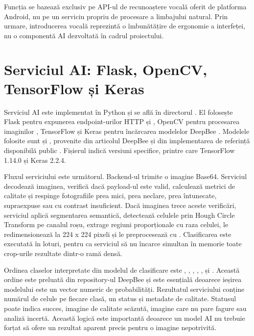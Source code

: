 Funcția se bazează exclusiv pe API-ul de recunoaștere vocală oferit de platforma Android, nu pe un serviciu propriu de procesare a limbajului natural. Prin urmare, introducerea vocală reprezintă o îmbunătățire de ergonomie a interfeței, nu o componentă AI dezvoltată în cadrul proiectului.

\section{Serviciul AI: Flask, OpenCV, TensorFlow și Keras}

Serviciul AI este implementat în Python și se află în directorul . El folosește Flask pentru expunerea endpoint-urilor HTTP  și  \cite{flaskDocs}, OpenCV pentru procesarea imaginilor \cite{opencvDocs}, TensorFlow și Keras pentru încărcarea modelelor DeepBee \cite{tensorflowDocs,kerasDocs}. Modelele folosite sunt  și , provenite din articolul DeepBee \cite{deepbeeArticle} și din implementarea de referință disponibilă public \cite{deepbeeSource}. Fișierul  indică versiuni specifice, printre care TensorFlow 1.14.0 și Keras 2.2.4.

Fluxul serviciului este următorul. Backend-ul trimite o imagine Base64. Serviciul decodează imaginea, verifică dacă payload-ul este valid, calculează metrici de calitate și respinge fotografiile prea mici, prea neclare, prea întunecate, supraexpuse sau cu contrast insuficient. Dacă imaginea trece aceste verificări, serviciul aplică segmentarea semantică, detectează celulele prin Hough Circle Transform pe canalul roșu, extrage regiuni proporționale cu raza celulei, le redimensionează la 224 x 224 pixeli și le preprocesează cu . Clasificarea este executată în loturi, pentru ca serviciul să nu încarce simultan în memorie toate crop-urile rezultate dintr-o ramă densă.

Ordinea claselor interpretate din modelul de clasificare este , , , , ,  și . Această ordine este preluată din repository-ul DeepBee și este esențială deoarece ieșirea modelului este un vector numeric de probabilități. Rezultatul serviciului conține numărul de celule pe fiecare clasă, un status și metadate de calitate. Statusul poate indica succes, imagine de calitate scăzută, imagine care nu pare fagure sau analiză incertă. Această logică este importantă deoarece un model AI nu trebuie forțat să ofere un rezultat aparent precis pentru o imagine nepotrivită.

